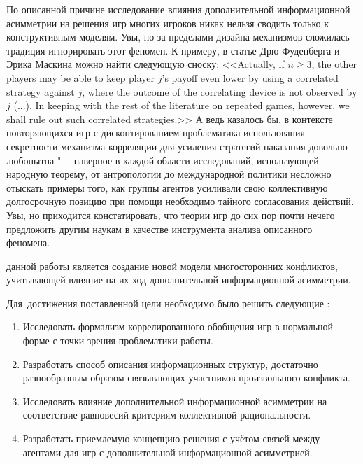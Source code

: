 По описанной причине исследование влияния дополнительной информационной асимметрии на решения игр многих игроков никак нельзя сводить только к конструктивным моделям. Увы, но за пределами дизайна механизмов сложилась традиция игнорировать этот феномен. К примеру, в статье \cite{Fudenberg} Дрю Фуденберга и Эрика Маскина можно найти следующую сноску: <<Actually, if $n \ge 3$, the other players may be able to keep player $j$'s payoff even lower by using a correlated strategy against $j$, where the outcome of the correlating device is not observed by $j$ (...). In keeping with the rest of the literature on repeated games, however, we shall rule out such correlated strategies.>> А ведь казалось бы, в контексте повторяющихся игр с дисконтированием проблематика использования секретности механизма корреляции для усиления стратегий наказания довольно любопытна "--- наверное в каждой области исследований, использующей народную теорему, от антропологии до международной политики несложно отыскать примеры того, как группы агентов усиливали свою коллективную долгосрочную позицию при помощи необходимо тайного согласования действий. Увы, но приходится констатировать, что теории игр до сих пор почти нечего предложить другим наукам в качестве инструмента анализа описанного феномена.


{\aim} данной работы является создание новой модели многосторонних конфликтов, учитывающей влияние на их ход дополнительной информационной асимметрии.

Для~достижения поставленной цели необходимо было решить следующие {\tasks}:
\begin{enumerate}[beginpenalty=10000] %
  \item Исследовать формализм коррелированного обобщения игр в нормальной форме с точки зрения проблематики работы.
  \item Разработать способ описания информационных структур, достаточно разнообразным образом связывающих участников произвольного конфликта.
  \item Исследовать влияние дополнительной информационной асимметрии на соответствие равновесий критериям коллективной рациональности.
  \item Разработать приемлемую концепцию решения с учётом связей между агентами для игр с дополнительной информационной асимметрией.
\end{enumerate}



